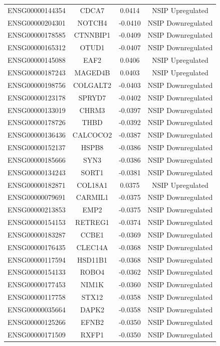 \documentclass[
]{article}
\begin{document}
\begin{singlespace}
\begin{longtable}[t]{lccc}
ENSG00000144354 & CDCA7 & 0.0414 & NSIP Upregulated\\
ENSG00000204301 & NOTCH4 & -0.0410 & NSIP Downregulated\\
\addlinespace
ENSG00000178585 & CTNNBIP1 & -0.0409 & NSIP Downregulated\\
ENSG00000165312 & OTUD1 & -0.0407 & NSIP Downregulated\\
ENSG00000145088 & EAF2 & 0.0406 & NSIP Upregulated\\
ENSG00000187243 & MAGED4B & 0.0403 & NSIP Upregulated\\
ENSG00000198756 & COLGALT2 & -0.0403 & NSIP Downregulated\\
\addlinespace
ENSG00000123178 & SPRYD7 & -0.0402 & NSIP Downregulated\\
ENSG00000133019 & CHRM3 & -0.0397 & NSIP Downregulated\\
ENSG00000178726 & THBD & -0.0392 & NSIP Downregulated\\
ENSG00000136436 & CALCOCO2 & -0.0387 & NSIP Downregulated\\
ENSG00000152137 & HSPB8 & -0.0386 & NSIP Downregulated\\
\addlinespace
ENSG00000185666 & SYN3 & -0.0386 & NSIP Downregulated\\
ENSG00000134243 & SORT1 & -0.0381 & NSIP Downregulated\\
ENSG00000182871 & COL18A1 & 0.0375 & NSIP Upregulated\\
ENSG00000079691 & CARMIL1 & -0.0375 & NSIP Downregulated\\
ENSG00000213853 & EMP2 & -0.0375 & NSIP Downregulated\\
\addlinespace
ENSG00000154153 & RETREG1 & -0.0374 & NSIP Downregulated\\
ENSG00000183287 & CCBE1 & -0.0369 & NSIP Downregulated\\
ENSG00000176435 & CLEC14A & -0.0368 & NSIP Downregulated\\
ENSG00000117594 & HSD11B1 & -0.0368 & NSIP Downregulated\\
ENSG00000154133 & ROBO4 & -0.0362 & NSIP Downregulated\\
\addlinespace
ENSG00000177453 & NIM1K & -0.0360 & NSIP Downregulated\\
ENSG00000117758 & STX12 & -0.0358 & NSIP Downregulated\\
ENSG00000035664 & DAPK2 & -0.0358 & NSIP Downregulated\\
ENSG00000125266 & EFNB2 & -0.0350 & NSIP Downregulated\\
ENSG00000171509 & RXFP1 & -0.0350 & NSIP Downregulated\\

\end{longtable}
\end{singlespace}
\end{document}
